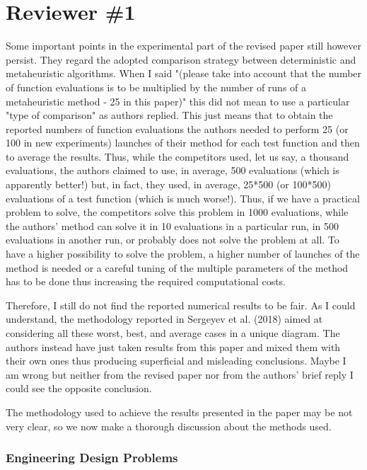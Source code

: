 
\section*{Reviewer \#1}

\begin{revAns}{Some important points in the experimental part of the revised paper still however persist. They regard the adopted comparison strategy between deterministic and metaheuristic algorithms. When I said "(please take into account that the number of function evaluations is to be multiplied by the number of runs of a metaheuristic method - 25 in this paper)" this did not mean to use a particular "type of comparison" as authors replied. This just means that to obtain the reported numbers of function evaluations the authors needed to perform 25 (or 100 in new experiments) launches of their method for each test function and then to average the results. Thus, while the competitors used, let us say, a thousand evaluations, the authors claimed to use, in average, 500 evaluations (which is apparently better!) but, in fact, they used, in average, 25*500 (or 100*500) evaluations of a test function (which is much worse!). Thus, if we have a practical problem to solve, the competitors solve this problem in 1000 evaluations, while the authors' method can solve it in 10 evaluations in a particular run, in 500 evaluations in another run, or probably does not solve the problem at all. To have a higher possibility to solve the problem, a higher number of launches of the method is needed or a careful tuning of the multiple parameters of the method has to be done thus increasing the required computational costs.
    
Therefore, I still do not find the reported numerical results to be fair. As I could understand, the methodology reported in Sergeyev et al. (2018) aimed at considering all these worst, best, and average cases in a unique diagram. The authors instead have just taken results from this paper and mixed them with their own ones thus producing superficial and misleading conclusions. Maybe I am wrong but neither from the revised paper nor from the authors' brief reply I could see the opposite conclusion.}

The methodology used to achieve the results presented in the paper may be not very clear, so we now make a thorough discussion about the methods used.


\subsubsection*{Engineering Design Problems}


\end{revAns}
